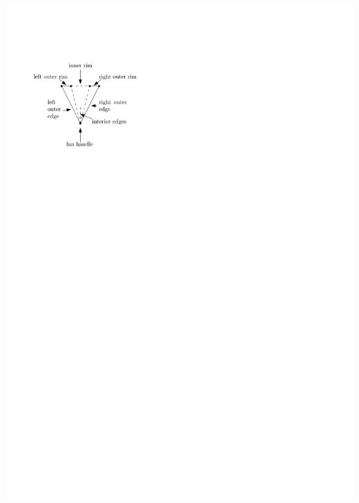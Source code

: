 \documentclass[a4paper]{article}
\begin{document}
\includegraphics[scale=1]{rectangularDuals/img/fanterms}
\clearpage%
\end{document}
